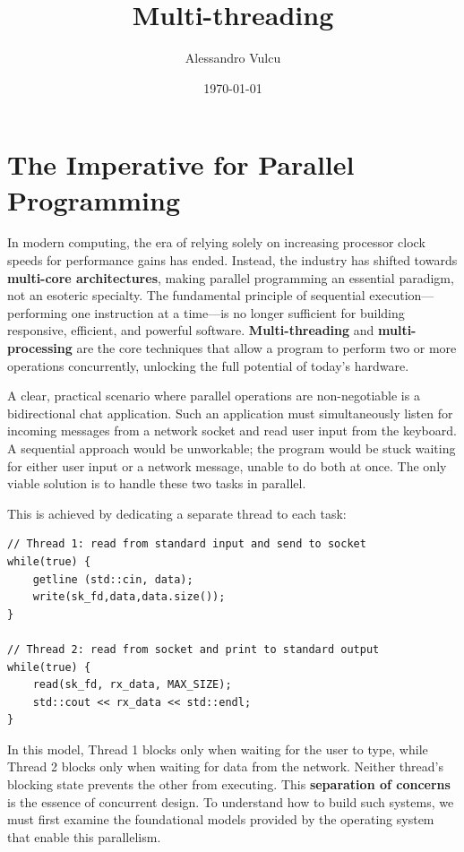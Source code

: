 \documentclass{article} %
\title{Multi-threading}
\author{Alessandro Vulcu}
\date{\today}
\begin{document}
\maketitle
\newpage
\tableofcontents
\newpage

\section{The Imperative for Parallel Programming}
In modern computing, the era of relying solely on increasing processor clock speeds for performance gains has ended. Instead, the industry has shifted towards \textbf{multi-core architectures}, making parallel programming an essential paradigm, not an esoteric specialty. The fundamental principle of sequential execution---performing one instruction at a time---is no longer sufficient for building responsive, efficient, and powerful software. \textbf{Multi-threading} and \textbf{multi-processing} are the core techniques that allow a program to perform two or more operations concurrently, unlocking the full potential of today's hardware.

A clear, practical scenario where parallel operations are non-negotiable is a bidirectional chat application. Such an application must simultaneously listen for incoming messages from a network socket and read user input from the keyboard. A sequential approach would be unworkable; the program would be stuck waiting for either user input or a network message, unable to do both at once. The only viable solution is to handle these two tasks in parallel.

This is achieved by dedicating a separate thread to each task:
\begin{center}
\begin{minipage}{0.9\textwidth}
\begin{verbatim}
// Thread 1: read from standard input and send to socket
while(true) {
    getline (std::cin, data);
    write(sk_fd,data,data.size());
}

// Thread 2: read from socket and print to standard output
while(true) {
    read(sk_fd, rx_data, MAX_SIZE);
    std::cout << rx_data << std::endl;
}
\end{verbatim}
\end{minipage}
\end{center}
In this model, Thread 1 blocks only when waiting for the user to type, while Thread 2 blocks only when waiting for data from the network. Neither thread's blocking state prevents the other from executing. This \textbf{separation of concerns} is the essence of concurrent design. To understand how to build such systems, we must first examine the foundational models provided by the operating system that enable this parallelism.
\end{document}
